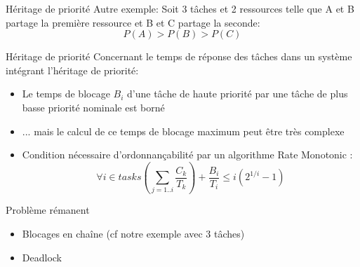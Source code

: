 \begin{frame}{Héritage de priorité}
  Autre exemple:
  Soit 3 tâches et 2 ressources telle que A et B partage la première ressource et B et C partage la seconde:
  $$P(A) > P(B) > P(C)$$
  \begin{center}
  \end{center}
\end{frame} 

\begin{frame}{Héritage de priorité} 
  Concernant le temps de réponse  des tâches dans un système intégrant
  l'héritage de priorité:
  \begin{itemize}
  \item Le  temps de blocage $B_i$  d'une tâche de  haute priorité par
    une tâche de plus basse priorité nominale est borné
  \item ...  mais le calcul de  ce temps de blocage  maximum peut être
    très complexe
  \item Condition nécessaire d'ordonnançabilité par un algorithme Rate
    Monotonic :
    $$\forall i \in tasks \left( \sum_{j = 1..i} \frac{C_k}{T_k} \right) + \frac{B_i}{T_i} \le i(2^{1/i} - 1)$$
  \end{itemize}
\end{frame}

\begin{frame}{Problème rémanent} 
  \begin{itemize}
  \item Blocages en chaîne (cf notre exemple avec 3 tâches)
  \item Deadlock
  \end{itemize}
\end{frame}


